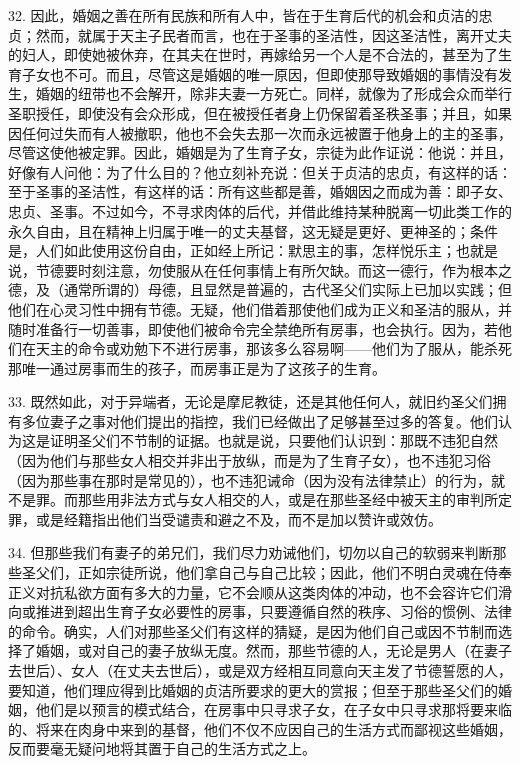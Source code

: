 32. 因此，婚姻之善在所有民族和所有人中，皆在于生育后代的机会和贞洁的忠贞；然而，就属于天主子民者而言，也在于圣事的圣洁性，因这圣洁性，离开丈夫的妇人，即使她被休弃，在其夫在世时，再嫁给另一个人是不合法的，甚至为了生育子女也不可。而且，尽管这是婚姻的唯一原因，但即使那导致婚姻的事情没有发生，婚姻的纽带也不会解开，除非夫妻一方死亡。同样，就像为了形成会众而举行圣职授任，即使没有会众形成，但在被授任者身上仍保留着圣秩圣事；并且，如果因任何过失而有人被撤职，他也不会失去那一次而永远被置于他身上的主的圣事，尽管这使他被定罪。因此，婚姻是为了生育子女，宗徒为此作证说：\newline{}他说：\newline{}并且，好像有人问他：为了什么目的？他立刻补充说：\newline{}但关于贞洁的忠贞，有这样的话：\newline{}至于圣事的圣洁性，有这样的话：\newline{}所有这些都是善，婚姻因之而成为善：即子女、忠贞、圣事。不过如今，不寻求肉体的后代，并借此维持某种脱离一切此类工作的永久自由，且在精神上归属于唯一的丈夫基督，这无疑是更好、更神圣的；条件是，人们如此使用这份自由，正如经上所记：默思主的事，怎样悦乐主；也就是说，节德要时刻注意，勿使服从在任何事情上有所欠缺。而这一德行，作为根本之德，及（通常所谓的）母德，且显然是普遍的，古代圣父们实际上已加以实践；但他们在心灵习性中拥有节德。无疑，他们借着那使他们成为正义和圣洁的服从，并随时准备行一切善事，即使他们被命令完全禁绝所有房事，也会执行。因为，若他们在天主的命令或劝勉下不进行房事，那该多么容易啊——他们为了服从，能杀死那唯一通过房事而生的孩子，而房事正是为了这孩子的生育。\par

33. 既然如此，对于异端者，无论是摩尼教徒，还是其他任何人，就旧约圣父们拥有多位妻子之事对他们提出的指控，我们已经做出了足够甚至过多的答复。他们认为这是证明圣父们不节制的证据。也就是说，只要他们认识到：那既不违犯自然（因为他们与那些女人相交并非出于放纵，而是为了生育子女），也不违犯习俗（因为那些事在那时是常见的），也不违犯诫命（因为没有法律禁止）的行为，就不是罪。而那些用非法方式与女人相交的人，或是在那些圣经中被天主的审判所定罪，或是经籍指出他们当受谴责和避之不及，而不是加以赞许或效仿。\par

34. 但那些我们有妻子的弟兄们，我们尽力劝诫他们，切勿以自己的软弱来判断那些圣父们，正如宗徒所说，他们拿自己与自己比较；因此，他们不明白灵魂在侍奉正义对抗私欲方面有多大的力量，它不会顺从这类肉体的冲动，也不会容许它们滑向或推进到超出生育子女必要性的房事，只要遵循自然的秩序、习俗的惯例、法律的命令。确实，人们对那些圣父们有这样的猜疑，是因为他们自己或因不节制而选择了婚姻，或对自己的妻子放纵无度。然而，那些节德的人，无论是男人（在妻子去世后）、女人（在丈夫去世后），或是双方经相互同意向天主发了节德誓愿的人，要知道，他们理应得到比婚姻的贞洁所要求的更大的赏报；但至于那些圣父们的婚姻，他们是以预言的模式结合，在房事中只寻求子女，在子女中只寻求那将要来临的、将来在肉身中来到的基督，他们不仅不应因自己的生活方式而鄙视这些婚姻，反而要毫无疑问地将其置于自己的生活方式之上。\par

